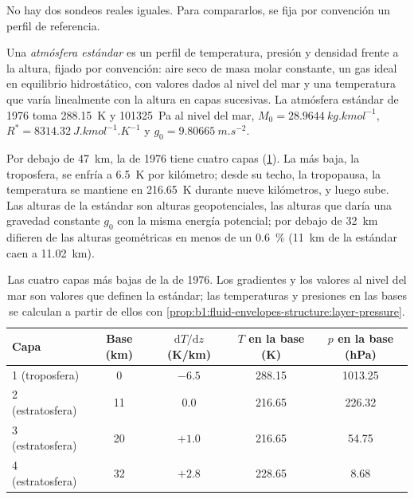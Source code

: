 No hay dos sondeos reales iguales. Para compararlos, se fija por convención un perfil de referencia.

\begin{definition}\label{def:b1:fluid-envelopes-structure:standard-atmosphere}
Una \emph{atmósfera estándar} es un perfil de
temperatura, presión y densidad frente a la altura, fijado por convención: aire seco de masa molar constante, un gas ideal en equilibrio hidrostático, con valores dados al nivel del mar y una temperatura que varía linealmente con la altura en capas sucesivas. La atmósfera estándar de 1976 toma \qty{288.15}{K} y
\qty{101325}{Pa} al nivel del mar, $M_0 = \qty{28.9644}{kg.kmol^{-1}}$,
$R^* = \qty{8314.32}{J.kmol^{-1}.K^{-1}}$ y $g_0 = \qty{9.80665}{m.s^{-2}}$.
\end{definition}

Por debajo de \qty{47}{km}, la  de 1976 tiene cuatro capas
(\cref{tab:b1:fluid-envelopes-structure:layers}). La más baja, la troposfera, se enfría a \qty{6.5}{K} por kilómetro; desde su techo, la tropopausa, la temperatura se mantiene en \qty{216.65}{K} durante nueve kilómetros, y luego sube. Las alturas de la estándar son alturas geopotenciales, las alturas que daría una gravedad constante $g_0$ con la misma energía potencial; por debajo de \qty{32}{km} difieren de las alturas geométricas en menos de un \qty{0.6}{\percent}
(\qty{11}{km} de la estándar caen a \qty{11.02}{km}).

\begin{table}[ht]
\centering
\small
\renewcommand{\arraystretch}{1.2}
\begin{tabular}{|l|c|c|c|c|}
\hline
Capa & Base (km) & $\mathrm dT/\mathrm dz$ (K/km) & $T$ en la base (K) & $p$ en la base (hPa) \\
\hline
1 (troposfera) & 0 & $-6.5$ & 288.15 & 1013.25 \\
2 (estratosfera) & 11 & 0.0 & 216.65 & 226.32 \\
3 (estratosfera) & 20 & $+1.0$ & 216.65 & 54.75 \\
4 (estratosfera) & 32 & $+2.8$ & 228.65 & 8.68 \\
\hline
\end{tabular}
\caption{Las cuatro capas más bajas de la  de 1976. Los gradientes y los valores al nivel del mar son valores que definen la estándar; las temperaturas y presiones en las bases se calculan a partir de ellos con \cref{prop:b1:fluid-envelopes-structure:layer-pressure}.}
\label{tab:b1:fluid-envelopes-structure:layers}
\end{table}

